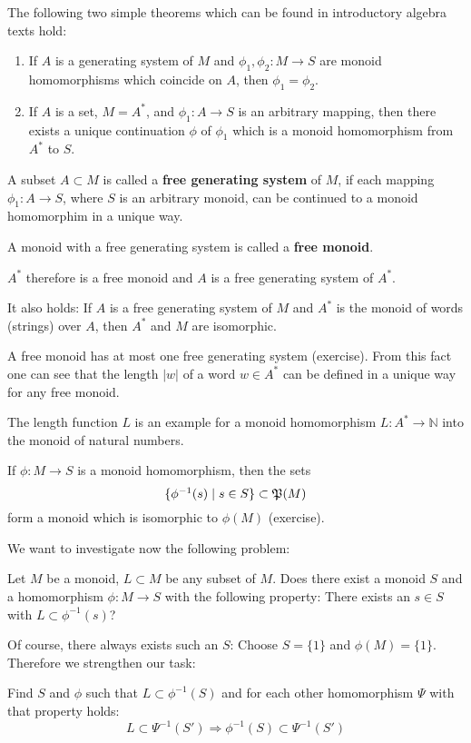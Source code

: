 The following two simple theorems which can be found in introductory algebra
texts hold:
\begin{enumerate}
  \item If $A$ is a generating system of $M$ and $\phi_1, \phi_2 : M \to S$ are
  monoid homomorphisms which coincide on $A$, then $\phi_1 = \phi_2$.
  \item If $A$ is a set, $M = A^*$, and $\phi_1 : A \to S$ is an arbitrary
  mapping, then there exists a unique continuation $\phi$ of $\phi_1$ which is
  a monoid homomorphism from $A^*$ to $S$.
\end{enumerate}

\begin{definition}
A subset $A \subset M$ is called a {\bf free generating system} of $M$, if each
mapping $\phi_1 : A \to S$, where $S$ is an arbitrary monoid, can be continued
to a monoid homomorphim in a unique way. 
\end{definition}

A monoid with a free generating system is called a {\bf free monoid}.

$A^*$ therefore is a free monoid and $A$ is a free generating system of $A^*$.

It also holds: If $A$ is a free generating system of $M$ and $A^*$ is the
monoid of words (strings) over $A$, then $A^*$ and $M$ are isomorphic.

A free monoid has at most one free generating system (exercise). From this fact
one can see that the length $|w|$ of a word $w \in A^*$ can be defined in a unique way for any
free monoid.

The length function $L$ is an example for a monoid homomorphism $L : A^* \to
\mathbb{N}$ into the monoid of natural numbers.

If $\phi : M \to S$ is a monoid homomorphism, then the sets 
\[ \mbox{$\{\phi^{-1}(s) \mid s \in S\}$} \subset \mathfrak{P}(M) \]
form a monoid which is isomorphic to $\phi(M)$ (exercise).

We want to investigate now the following problem:

Let $M$ be a monoid, $L \subset M$ be any subset of $M$. Does there exist a
monoid $S$ and a homomorphism $\phi : M \to S$ with the following property:
There exists an $s \in S$ with $L \subset \phi^{-1}(s)$?

Of course, there always exists such an $S$: Choose $S = \{ 1 \}$ and $\phi(M) =
\{1\}$. Therefore we strengthen our task: 

Find $S$ and $\phi$ such that $L \subset \phi^{-1}(S)$ and for each other
homomorphism $\Psi$ with that property holds:
\[ L \subset \Psi^{-1}(S') \Rightarrow \phi^{-1}(S) \subset \Psi^{-1}(S') \]

